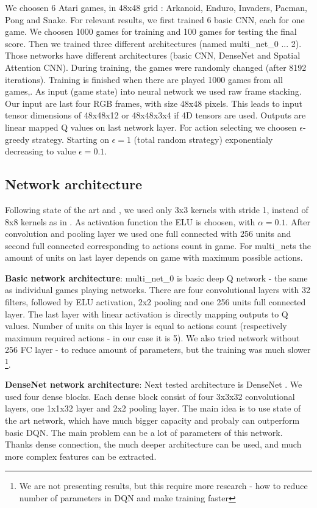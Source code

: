 \documentclass[10pt,a4paper]{article}
\begin{document}
We choosen 6 Atari games, in 48x48 grid : Arkanoid, Enduro, Invaders, Pacman, Pong and Snake.
For relevant results, we first trained 6 basic CNN, each for one game. We choosen 1000 games for training and 100 games for testing the final score.
Then we trained three different architectures (named multi\_net\_0 ... 2). Those networks have different architectures (basic CNN, DenseNet and Spatial Attention CNN).
During training, the games were randomly changed (after 8192 iterations). Training is finished when there are played 1000 games from all games,.
As input (game state) into neural network we used raw frame stacking. Our input are last four RGB frames, with size 48x48 pixels. This leads to input tensor dimensions of 48x48x12 or 48x48x3x4 if
4D tensors are used. Outputs are linear mapped Q values on last network layer.
For action selecting we choosen $\epsilon$-greedy strategy. Starting on $\epsilon = 1$ (total random strategy) exponentialy decreasing to value $\epsilon = 0.1$.

\subsection {Network architecture}
Following state of the art \cite{bib:vgg_net} and \cite{bib:resnet_net}, we used only 3x3 kernels with stride 1, instead of 8x8 kernels as in \cite{bib:dqn_atari}.
As activation function the ELU is choosen, with $\alpha = 0.1$. After convolution and pooling layer we used one full connected with 256 units and second
full connected corresponding to actions count in game. For multi\_nets the amount of units on last layer depends on game with maximum possible actions.

{\bf Basic network architecture}:
multi\_net\_0 is basic deep Q network - the same as individual games playing networks.
There are four convolutional layers with 32 filters, followed by ELU activation, 2x2 pooling and one 256 units full connected layer.
The last layer with linear activation is directly mapping outputs to Q values. Number of units on this layer is equal to actions count
(respectively maximum required actions - in our case it is 5).
We also tried network without 256 FC layer - to reduce amount of parameters, but the training was much slower \footnote {We are not presenting results, but this require more research - how to reduce number of parameters in DQN and make training faster}.

{\bf DenseNet network architecture}:
Next tested architecture is DenseNet \cite{bib:densenet_net}. We used four dense blocks. Each dense block consist of four 3x3x32 convolutional layers, one 1x1x32 layer and 2x2 pooling layer.
The main idea is to use state of the art network, which have much bigger capacity and probaly can outperform basic DQN. The main problem can be a lot
of parameters of this network. Thanks dense connection, the much deeper architecture can be used, and much more complex features can be extracted.
\end{document}
